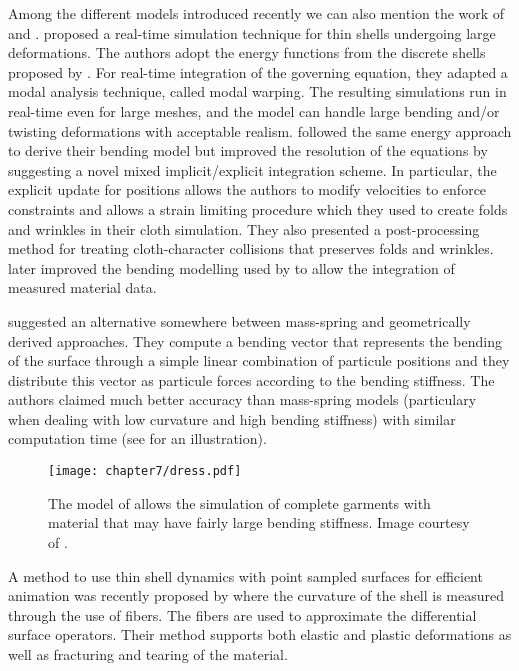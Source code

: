 Among the different models introduced recently we can also mention the work of \cite{Choi07} and \cite{Bridson03}. \citeauthor{Choi07}  proposed a real-time simulation technique for thin shells undergoing large deformations. The authors adopt the energy functions from the discrete shells proposed by \cite{Grinspun03}. For real-time integration of the governing equation, they adapted a modal analysis technique, called modal warping. The resulting simulations run in real-time even for large meshes, and the model can handle large bending and/or twisting deformations with acceptable realism. \citeauthor{Bridson03} followed the same energy approach to derive their bending model but improved the resolution of the equations by suggesting a novel mixed implicit/explicit integration scheme. In particular, the explicit update for positions allows the authors to modify velocities to enforce constraints and allows a strain limiting procedure which they used to create folds and wrinkles in their cloth simulation. They also presented a post-processing method for treating cloth-character collisions that preserves folds and wrinkles. \cite{Pabst08} later improved the bending modelling used by \citeauthor{Bridson03} to allow the integration of measured material data. 

\cite{Volino06} suggested an alternative somewhere between mass-spring and geometrically derived approaches. They compute a bending vector that represents the bending of the surface through  a simple linear combination of particule positions and they distribute this vector as particule forces according to the bending stiffness. The authors claimed much better accuracy than mass-spring models (particulary when dealing with low curvature and high bending stiffness) with similar computation time (see  for an illustration). 
%
\begin{figure}[ht]
\begin{center}
\texttt{[image: chapter7/dress.pdf]}
\caption[Simulation of complete garments that have large bending stiffness]{The model of \citeauthor{Volino06} allows the simulation of complete garments with material that may have fairly large bending stiffness. Image courtesy of \cite{Volino06}.}
\label{chap7:fig-dress}
\end{center}
\end{figure}

A method to use thin shell dynamics with point sampled surfaces for efficient animation was recently proposed by \cite{Wicke05} where the curvature of the shell is measured through the use of fibers. The fibers are used to approximate the differential surface operators. Their method supports both elastic and plastic deformations as well as fracturing and tearing of the material. 
		

